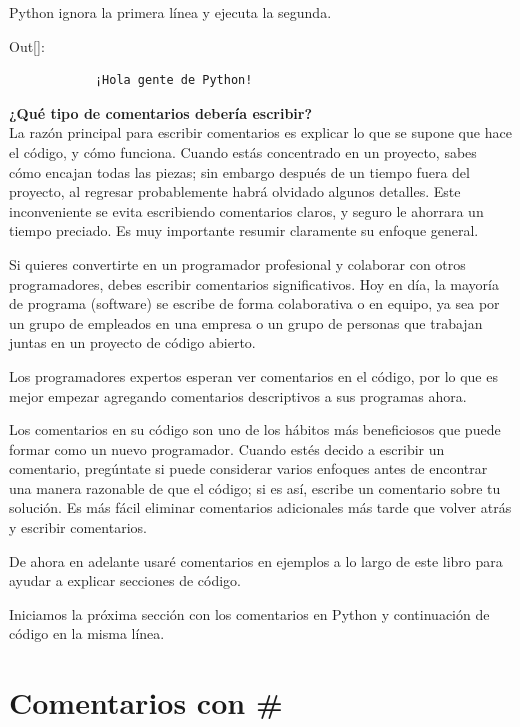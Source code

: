 Python ignora la primera línea y ejecuta la segunda.\\

{\ttfamily\scriptsize\scriptsize 
	\hspace{-0.65cm}Out[]:\vspace{-0.15cm}	
	{\color{blue} 	
		\begin{verbatim}
			¡Hola gente de Python!
		\end{verbatim}
}}




{\bf ¿Qué tipo de comentarios debería escribir?}\\


La razón principal para escribir comentarios es explicar lo que se supone que hace el código, 
y cómo funciona. Cuando estás concentrado en un proyecto, sabes  cómo encajan todas las piezas; sin embargo 
después de un tiempo fuera del proyecto, al regresar  probablemente habrá olvidado algunos  detalles. Este  inconveniente se evita escribiendo  comentarios claros, y seguro le ahorrara un tiempo preciado. Es muy importante resumir claramente su enfoque general.

Si quieres convertirte en un programador profesional y colaborar con otros programadores,
debes escribir comentarios significativos. Hoy en día, la mayoría de programa (software) se escribe de forma colaborativa o en equipo, 
ya sea por un grupo de empleados en una empresa o un grupo de personas que trabajan juntas en un proyecto de código abierto.

Los programadores expertos esperan ver comentarios en el código, por lo que es mejor empezar
agregando comentarios descriptivos a sus programas ahora. 


Los comentarios en su código son uno de los hábitos más beneficiosos que puede formar como
un nuevo programador. Cuando estés decido a  escribir un comentario, pregúntate si
puede  considerar varios enfoques antes de encontrar una manera razonable de que el código; si es así, escribe un comentario sobre tu solución.  Es más fácil eliminar comentarios adicionales más tarde que volver atrás y escribir comentarios. 

De ahora en adelante usaré comentarios en ejemplos a lo largo de este libro para ayudar a explicar secciones de código.


Iniciamos la próxima sección con los comentarios en Python y continuación de código en la misma línea. 

\section{Comentarios  con  {\ttfamily \#}}   %

